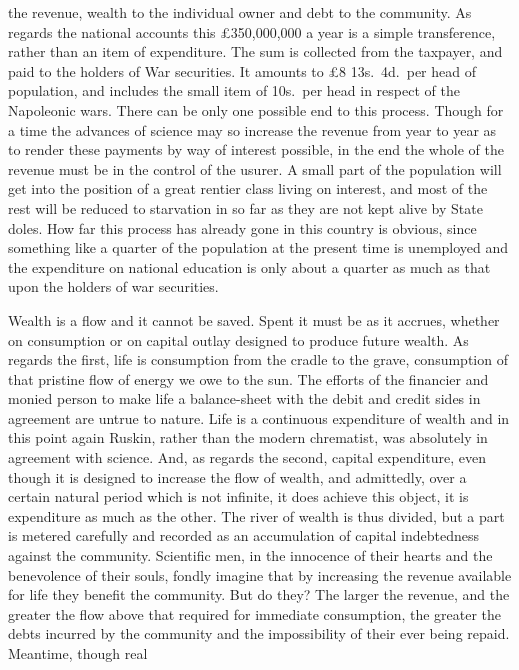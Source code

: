 \documentclass[10.5pt,twoside]{book}
\newcommand{\origpage}[1]{\clearpage\setcounter{page}{#1}}
\begin{document}
\origpage{28}

\noindent the revenue, wealth to the individual owner and debt to the
community. As regards the national accounts this \pounds350,000,000 a year is
a simple transference, rather than an item of expenditure. The sum is
collected from the taxpayer, and paid to the holders of War securities. It
amounts to \pounds8 13s.\ 4d.\ per head of population, and includes the small
item of 10s.\ per head in respect of the Napoleonic wars. There can be only
one possible end to this process. Though for a time the advances of science
may so increase the revenue from year to year as to render these payments by
way of interest possible, in the end the whole of the revenue must be in the
control of the usurer. A small part of the population will get into the
position of a great rentier class living on interest, and most of the rest
will be reduced to starvation in so far as they are not kept alive by State
doles. How far this process has already gone in this country is obvious, since
something like a quarter of the population at the present time is unemployed
and the expenditure on national education is only about a quarter as much as
that upon the holders of war securities.

Wealth is a flow and it cannot be saved. Spent it must be as it accrues,
whether on consumption or on capital outlay designed to produce future wealth.
As regards the first, life is consumption from the cradle to the grave,
consumption of that pristine flow of energy we owe to the sun. The efforts of
the financier and monied person to make life a balance-sheet with the debit
and credit sides in agreement are untrue to nature. Life is a continuous
expenditure of wealth and in this point again Ruskin, rather than the modern
chrematist, was absolutely in agreement with science. And, as regards the
second, capital expenditure, even though it is designed to increase the flow
of wealth, and admittedly, over a certain natural period which is not
infinite, it does achieve this object, it is expenditure as much as the other.
The river of wealth is thus divided, but a part is metered carefully and
recorded as an accumulation of capital indebtedness against the community.
Scientific men, in the innocence of their hearts and the benevolence of their
souls, fondly imagine that by increasing the revenue available for life they
benefit the community. But do they? The larger the revenue, and the greater
the flow above that required for immediate consumption, the greater the debts
incurred by the community and the impossibility of their ever being repaid.
Meantime, though real
\end{document}
